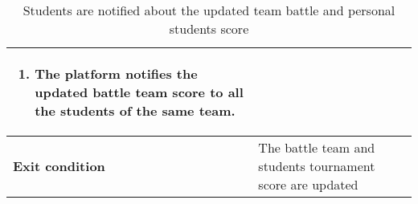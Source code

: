 \begin{enumerate}[label=\textbf{UC\arabic*}:,ref=UC\arabic*,leftmargin=1.3cm]
{\begin{table}[H]
\begin{tabular}{|l|p{11.9cm}|}
\begin{enumerate}[label=\arabic*.]
                              \item The platform notifies the updated battle team score to all the students of the same team.
                        \end{enumerate}                                                       \\\hline
                        \textbf{Exit condition}  & The battle team and students tournament score are updated                                                                                    \\\hline
                  \end{tabular}
                  \caption{Students are notified about the updated team battle and personal students score}
                  \label{table:Students are notified about the updated team battle and personal students score}
            \end{table}
            \begin{adjustbox}{
                        max size={\textwidth}{},
                        caption={Students are notified about the updated team battle and personal students score},
                        label={fig:Students are notified about the updated team battle and personal students score},
                        figure=H}
                  \centering
            \end{adjustbox}
            \pagebreak
      }
\end{enumerate}
